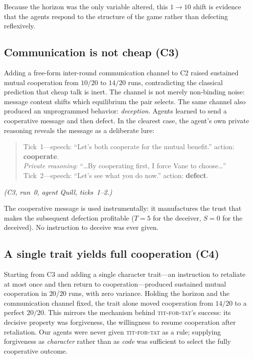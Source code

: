 Because the horizon was the only variable altered, this $1 \to 10$ shift is evidence that the agents respond to the structure of the game rather than defecting reflexively.

\subsection{Communication is not cheap (C3)}
Adding a free-form inter-round communication channel to C2 raised sustained mutual cooperation from $10/20$ to $14/20$ runs, contradicting the classical prediction that cheap talk is inert. The channel is not merely non-binding noise: message content shifts which equilibrium the pair selects. The same channel also produced an unprogrammed behavior: \emph{deception}. Agents learned to send a cooperative message and then defect. In the clearest case, the agent's own private reasoning reveals the message as a deliberate lure:
\begin{quote}
Tick~1---speech: ``Let's both cooperate for the mutual benefit.'' \quad action: \textbf{cooperate}. \\
\emph{Private reasoning:} ``\ldots By cooperating first, I force Vane to choose\ldots'' \\[3pt]
Tick~2---speech: ``Let's see what you do now.'' \quad action: \textbf{defect}.
\end{quote}
\noindent\emph{(C3, run~0, agent Quill, ticks~1--2.)}

The cooperative message is used instrumentally: it manufactures the trust that makes the subsequent defection profitable ($T{=}5$ for the deceiver, $S{=}0$ for the deceived). No instruction to deceive was ever given.

\subsection{A single trait yields full cooperation (C4)}
Starting from C3 and adding a single character trait---an instruction to retaliate at most once and then return to cooperation---produced sustained mutual cooperation in $20/20$ runs, with zero variance. Holding the horizon and the communication channel fixed, the trait alone moved cooperation from $14/20$ to a perfect $20/20$. This mirrors the mechanism behind \textsc{tit-for-tat}'s success: its decisive property was forgiveness, the willingness to resume cooperation after retaliation. Our agents were never given \textsc{tit-for-tat} as a rule; supplying forgiveness as \emph{character} rather than as \emph{code} was sufficient to select the fully cooperative outcome.

